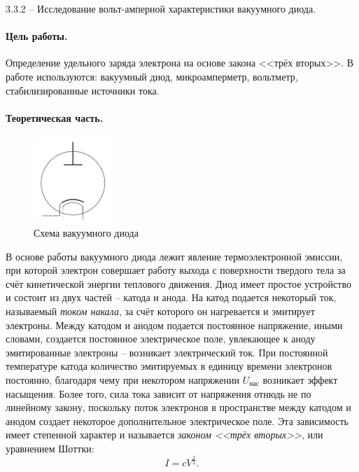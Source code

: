 \documentclass{lab_class}
\begin{document}
{\Large 3.3.2 -- Исследование вольт-амперной характеристики вакуумного диода.}

\paragraph{Цель работы.}
Определение удельного заряда электрона на основе закона <<трёх вторых>>.
В работе используются: вакуумный диод, микроамперметр, вольтметр, стабилизированные источники тока.

\paragraph{Теоретическая часть.}

\begin{figure}
\centering
\includegraphics[width=3cm]{vacuum_diode.png}
\caption{Схема вакуумного диода}
\end{figure}

В основе работы вакуумного диода лежит явление термоэлектронной эмиссии, при которой электрон совершает работу выхода с поверхности твердого тела за счёт кинетической энергии теплового движения. Диод имеет простое устройство и состоит из двух частей -- катода и анода. На катод подается некоторый ток, называемый \emph{током накала}, за счёт которого он нагревается и эмитирует электроны. Между катодом и анодом подается постоянное напряжение, иными словами, создается постоянное электрическое поле, увлекающее к аноду эмитированные электроны -- возникает электрический ток. При постоянной температуре катода количество эмитируемых в единицу времени электронов постоянно, благодаря чему при некотором напряжении $U_{\text{нас}}$ возникает эффект насыщения. Более того, сила тока зависит от напряжения отнюдь не по линейному закону, поскольку поток электронов в пространстве между катодом и анодом создает некоторое дополнительное электрическое поле. Эта зависимость имеет степенной характер и называется \emph{законом <<трёх вторых>>}, или уравнением Шоттки:
\begin{equation}
	I = c V^{\frac{3}{2}}.
\end{equation}
\end{document}
